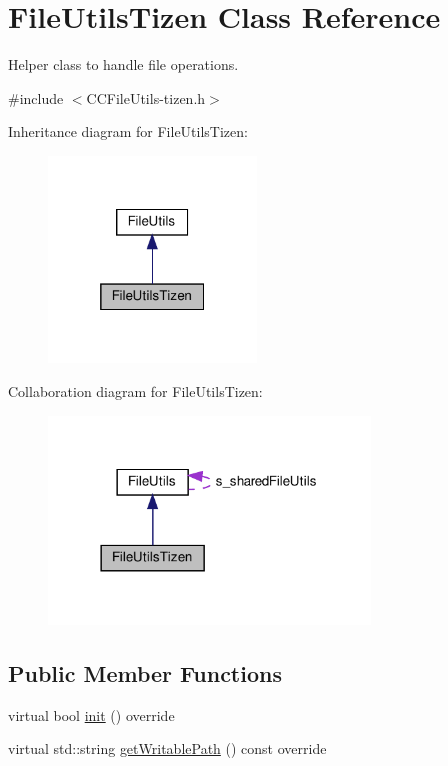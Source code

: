\hypertarget{classFileUtilsTizen}{}\section{File\+Utils\+Tizen Class Reference}
\label{classFileUtilsTizen}


Helper class to handle file operations.  




{\ttfamily \#include $<$C\+C\+File\+Utils-\/tizen.\+h$>$}



Inheritance diagram for File\+Utils\+Tizen\+:
\nopagebreak
\begin{figure}[H]
\begin{center}
\leavevmode
\includegraphics[width=157pt]{classFileUtilsTizen__inherit__graph}
\end{center}
\end{figure}


Collaboration diagram for File\+Utils\+Tizen\+:
\nopagebreak
\begin{figure}[H]
\begin{center}
\leavevmode
\includegraphics[width=242pt]{classFileUtilsTizen__coll__graph}
\end{center}
\end{figure}
\subsection*{Public Member Functions}
\begin{DoxyCompactItemize}
\item 
virtual bool \hyperlink{classFileUtilsTizen_a3c094c5c41c9f01e31158e1c81690419}{init} () override
\item 
virtual std\+::string \hyperlink{classFileUtilsTizen_a5ded2b60f350ec2b245c97ec48e57ffc}{get\+Writable\+Path} () const override
\end{DoxyCompactItemize}
